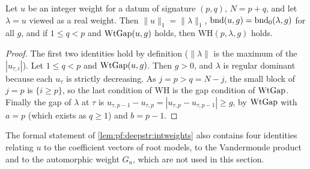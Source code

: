 \begin{lemma}\label{lem:pf:deepstr:intweights}
Let $u$ be an integer weight for a datum of signature $(p,q)$, $N=p+q$, and let $\lambda=u$ viewed as a real
weight. Then $\|u\|_1=\|\lambda\|_1$, $\operatorname{bnd}(u,g)=\operatorname{bnd}_0(\lambda,g)$ for all $g$, and if $1\le q<p$
and $\operatorname{WtGap}(u,g)$ holds, then $\mathrm{WH}(p,\lambda,g)$ holds.
\end{lemma}

\begin{proof}
The first two identities hold by definition ($\|\lambda\|$ is the maximum of the $|u_{\tau,i}|$). Let
$1\le q<p$ and $\operatorname{WtGap}(u,g)$. Then $g>0$, and $\lambda$ is regular dominant because each $u_\tau$ is
strictly decreasing. As $j=p>q=N-j$, the small block of $j=p$ is $\{i\ge p\}$, so the last condition of
$\mathrm{WH}$ is the gap condition of $\operatorname{WtGap}$. Finally the gap of $\lambda$ at $\tau$ is
$u_{\tau,p-1}-u_{\tau,p}=|u_{\tau,p}-u_{\tau,p-1}|\ge g$, by $\operatorname{WtGap}$ with $a=p$ (which exists as
$q\ge1$) and $b=p-1$.
\end{proof}

The formal statement of \cref{lem:pf:deepstr:intweights} also contains four identities relating $u$ to the
coefficient vectors of root models, to the Vandermonde product and to the automorphic weight $G_u$, which are
not used in this section.

